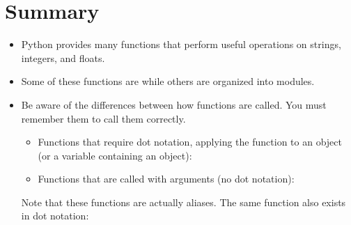 \documentclass[letterpaper,10pt,english]{sphinxmanual}
\begin{document}
\section{Summary}
\label{\detokenize{lecture_notes/lec04_modules_functions1:summary}}\begin{itemize}
\item {} 
Python provides many functions that perform useful operations on
strings, integers, and floats.

\item {} 
Some of these functions are  while others are organized
into modules.

\item {} 
Be aware of the differences between how functions are called. You
must remember them to call them correctly.
\begin{itemize}
\item {} 
Functions that require dot notation, applying the function
to an object (or a variable containing an object):

\end{itemize}

\begin{sphinxVerbatim}[commandchars=\\\{\}]
\end{sphinxVerbatim}
\begin{itemize}
\item {} 
Functions that are called with arguments (no dot notation):

\end{itemize}

\begin{sphinxVerbatim}[commandchars=\\\{\}]
  
\end{sphinxVerbatim}

Note that these functions are actually aliases. The same function
also exists in dot notation:


\end{itemize}
\end{document}
